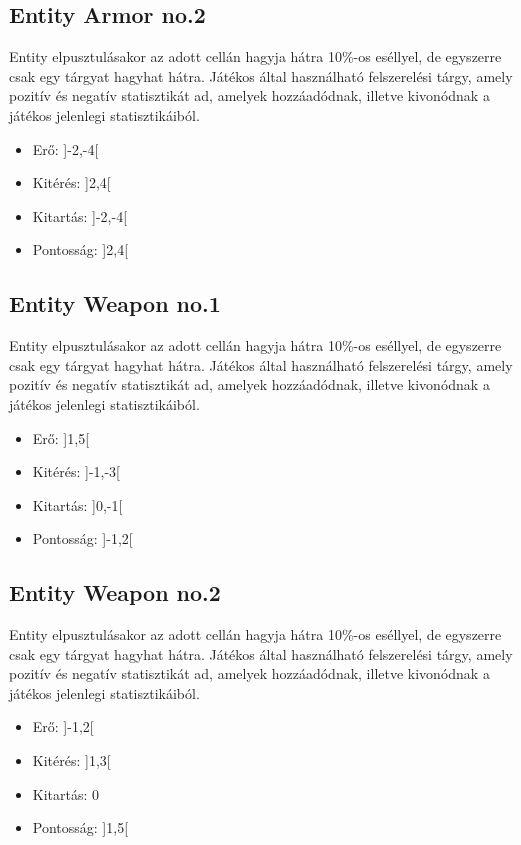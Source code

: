 \subsection{Entity Armor no.2}

Entity elpusztulásakor az adott cellán hagyja hátra 10\%-os eséllyel, de egyszerre csak egy tárgyat hagyhat hátra.
Játékos által használható felszerelési tárgy, amely pozitív és negatív statisztikát ad, amelyek hozzáadódnak, illetve kivonódnak a játékos jelenlegi statisztikáiból.

\begin{itemize}
    \item Erő: ]-2,-4[
    \item Kitérés: ]2,4[
    \item Kitartás: ]-2,-4[
    \item Pontosság: ]2,4[
\end{itemize}

\subsection{Entity Weapon no.1}

Entity elpusztulásakor az adott cellán hagyja hátra 10\%-os eséllyel, de egyszerre csak egy tárgyat hagyhat hátra.
Játékos által használható felszerelési tárgy, amely pozitív és negatív statisztikát ad, amelyek hozzáadódnak, illetve kivonódnak a játékos jelenlegi statisztikáiból.

\begin{itemize}
    \item Erő: ]1,5[
    \item Kitérés: ]-1,-3[
    \item Kitartás: ]0,-1[
    \item Pontosság: ]-1,2[
\end{itemize}

\subsection{Entity Weapon no.2}

Entity elpusztulásakor az adott cellán hagyja hátra 10\%-os eséllyel, de egyszerre csak egy tárgyat hagyhat hátra.
Játékos által használható felszerelési tárgy, amely pozitív és negatív statisztikát ad, amelyek hozzáadódnak, illetve kivonódnak a játékos jelenlegi statisztikáiból.

\begin{itemize}
    \item Erő: ]-1,2[
    \item Kitérés: ]1,3[
    \item Kitartás: 0
    \item Pontosság: ]1,5[
\end{itemize}

